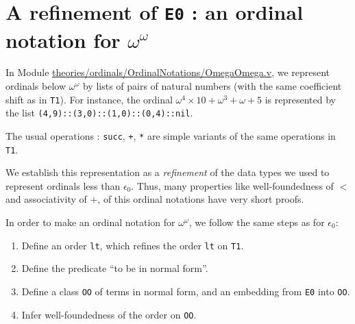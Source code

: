     \section{A refinement of \texttt{E0} : an ordinal notation for \texorpdfstring{$\omega^\omega$}{omega\^omega}}

    In Module   \href{https://github.com/coq-community/hydra-battles/blob/master/theories/ordinals/OrdinalNotations/OmegaOmega.v}{theories/ordinals/OrdinalNotations/OmegaOmega.v},
    we represent ordinals below $\omega^\omega$ by lists of pairs of natural numbers (with the same coefficient shift as in \texttt{T1}).
    For instance, the ordinal $\omega^4\times 10 + \omega^3 + \omega+ 5$ is represented by the list \texttt{(4,9)::(3,0)::(1,0)::(0,4)::nil}.

    
    
  The usual operations : \texttt{succ}, \texttt{+}, \texttt{*} are simple variants of the same operations in \texttt{T1}.

  
    We establish this representation as a \emph{refinement} of the data types we used to represent ordinals less than $\epsilon_0$. Thus, many properties like well-foundedness of $<$ and associativity of $+$,  of this ordinal notations have very short proofs.


    In order to make an ordinal notation for $\omega^\omega$, we follow the same steps as for $\epsilon_0$:
    \begin{enumerate}
    \item Define an order \texttt{lt}, which refines the order
      \texttt{lt} on \texttt{T1}.
      
    \item Define the predicate ``to be in normal form''.
    \item Define a class \texttt{OO} of terms in normal form, and an embedding from \texttt{E0} into \texttt{OO}.
      \item Infer well-foundedness of the order on \texttt{OO}.
      
    \end{enumerate}


